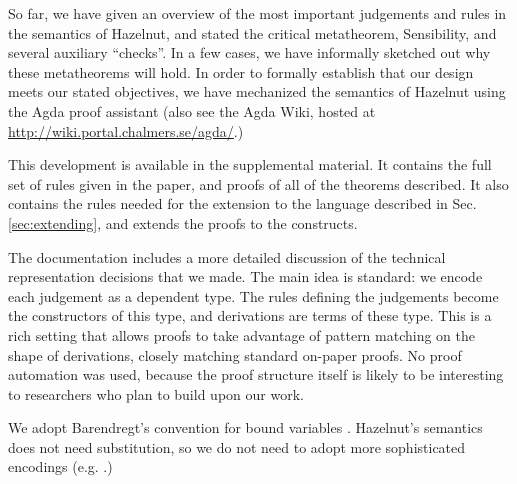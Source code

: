 So far, we have given an overview of the most important judgements and
rules in the semantics of Hazelnut, and stated the critical metatheorem,
Sensibility, and several auxiliary ``checks''. In a few cases, we have
informally sketched out why these metatheorems will hold. In order to
formally establish that our design meets our stated objectives, we have
mechanized the semantics of Hazelnut using the Agda proof
assistant \cite{norell:thesis} (also see the Agda Wiki, hosted
at \url{http://wiki.portal.chalmers.se/agda/}.)

This development is available in the supplemental material. It contains the
full set of rules given in the paper, and proofs of all of the theorems
described. It also contains the rules needed for the extension to the
language described in Sec. \ref{sec:extending}, and extends the proofs to
the constructs.

The documentation includes a more detailed discussion of the technical
representation decisions that we made. The main idea is standard: we encode
each judgement as a dependent type. The rules defining the judgements
become the constructors of this type, and derivations are terms of these
type. This is a rich setting that allows proofs to take advantage of
pattern matching on the shape of derivations, closely matching standard
on-paper proofs. No proof automation was used, because the proof structure
itself is likely to be interesting to researchers who plan to build upon
our work.

We adopt Barendregt's convention for bound
variables \cite{urban}. Hazelnut's semantics does not need substitution, so
we do not need to adopt more sophisticated encodings
(e.g. \cite{lh09unibind,Pouillard11}.)
